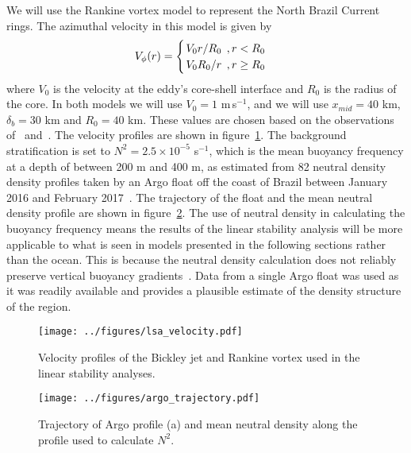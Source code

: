 We will use the Rankine vortex model to represent the North Brazil Current rings. The azimuthal velocity in this model is given by
\begin{equation}
    V_{\phi}(r) = 
    \begin{cases}
        \flatfrac{V_0 r}{R_0} \, , r < R_0 \\
        \flatfrac{V_0 R_0}{r} \, , r \geq R_0
    \end{cases}
\end{equation}
where $V_0$ is the velocity at the eddy's core-shell interface and $R_0$ is the radius of the core. In both models we will use $V_0 = 1$ m$\,$s$^{-1}$, and we will use $x_{mid} = 40$ km, $\delta_b = 30$ km and $R_0 = 40$ km. These values are chosen based on the observations of~\citet{Johns1998} and~\citet{Castelao2011}. The velocity profiles are shown in figure~\ref{fig:InitialVelocity}. The background stratification is set to $N^2 = 2.5 \times 10^{-5}$ s$^{-1}$, which is the mean buoyancy frequency at a depth of between 200 m and 400 m, as estimated from 82 neutral density density profiles taken by an Argo float off the coast of Brazil between January 2016 and February 2017~\citep{Argo2019}. The trajectory of the float and the mean neutral density profile are shown in figure~\ref{fig:InitialStratification}. The use of neutral density in calculating the buoyancy frequency means the results of the linear stability analysis will be more applicable to what is seen in models presented in the following sections rather than the ocean. This is because the neutral density calculation does not reliably preserve vertical buoyancy gradients~\citep{Eden1999}. Data from a single Argo float was used as it was readily available and provides a plausible estimate of the density structure of the region.
\begin{figure}
    \centering
    \texttt{[image: ../figures/lsa\_velocity.pdf]}
    \caption{Velocity profiles of the Bickley jet and Rankine vortex used in the linear stability analyses.}
    \label{fig:InitialVelocity}

\end{figure}

\begin{figure}
    \centering
    \texttt{[image: ../figures/argo\_trajectory.pdf]}
    \caption{Trajectory of Argo profile (a) and mean neutral density along the profile used to calculate $N^2$.}
    \label{fig:InitialStratification}
\end{figure}

